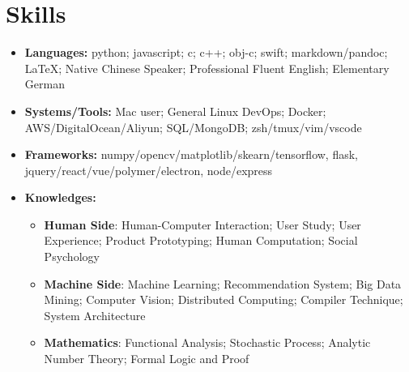 \documentclass[letterpaper,11pt]{article}
\newcommand{\resumeItem}[2]{
  \item\small{
    \textbf{#1}{: #2 \vspace{-2pt}}
  }
}
\newcommand{\resumeSubHeadingListStart}{\begin{itemize}[leftmargin=*]}
\newcommand{\resumeSubHeadingListEnd}{\end{itemize}}
\newcommand{\resumeItemListStart}{\begin{itemize}}
\newcommand{\resumeItemListEnd}{\end{itemize}\vspace{-5pt}}
\begin{document}
\section{Skills}
 \resumeSubHeadingListStart
   \item{
     \textbf{Languages:}{ python; javascript; c; c++; obj-c; swift; markdown/pandoc; \LaTeX; Native Chinese Speaker; Professional Fluent English; Elementary German}
   }
   \item{
    \textbf{Systems/Tools:}{ Mac user; General Linux DevOps; Docker; AWS/DigitalOcean/Aliyun; SQL/MongoDB; zsh/tmux/vim/vscode}
   }
   \item{
    \textbf{Frameworks:}{ numpy/opencv/matplotlib/skearn/tensorflow, flask, jquery/react/vue/polymer/electron, node/express}
   }
   \item{
     \textbf{Knowledges:}{ 
       \resumeItemListStart
        \resumeItem{Human Side}
          { Human-Computer Interaction; User Study; User Experience; Product Prototyping; Human Computation; Social Psychology}
        \resumeItem{Machine Side}
          { Machine Learning; Recommendation System; Big Data Mining; Computer Vision; Distributed Computing; Compiler Technique; System Architecture}
        \resumeItem{Mathematics}
          { Functional Analysis; Stochastic Process; Analytic Number Theory; Formal Logic and Proof}
      \resumeItemListEnd
     }
   }
 \resumeSubHeadingListEnd
\end{document}
